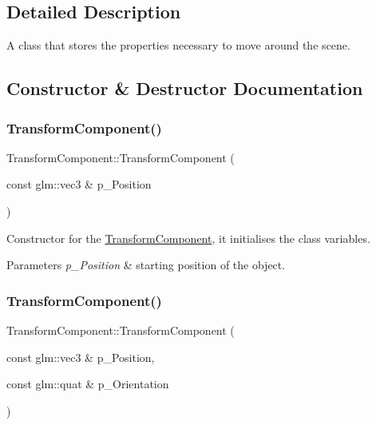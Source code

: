 \subsection{Detailed Description}
A class that stores the properties necessary to move around the scene. 

\subsection{Constructor \& Destructor Documentation}
\mbox{\label{class_transform_component_afc7699834c48ec6c5e222d8b09ec3eb4}} 
\subsubsection{\texorpdfstring{TransformComponent()}{TransformComponent()}\hspace{0.1cm}{\footnotesize\ttfamily [1/3]}}
{\footnotesize\ttfamily Transform\+Component\+::\+Transform\+Component (\begin{DoxyParamCaption}\item[{const glm\+::vec3 \&}]{p\+\_\+\+Position }\end{DoxyParamCaption})\hspace{0.3cm}{\ttfamily [inline]}}



Constructor for the \mbox{\hyperlink{class_transform_component}{Transform\+Component}}, it initialises the class\textquotesingle{} variables. 


\begin{DoxyParams}{Parameters}
{\em p\+\_\+\+Position} & starting position of the object. \\
\hline
\end{DoxyParams}
\mbox{\label{class_transform_component_a86691630518539b29654c71af3e5b50a}} 
\subsubsection{\texorpdfstring{TransformComponent()}{TransformComponent()}\hspace{0.1cm}{\footnotesize\ttfamily [2/3]}}
{\footnotesize\ttfamily Transform\+Component\+::\+Transform\+Component (\begin{DoxyParamCaption}\item[{const glm\+::vec3 \&}]{p\+\_\+\+Position,  }\item[{const glm\+::quat \&}]{p\+\_\+\+Orientation }\end{DoxyParamCaption})\hspace{0.3cm}{\ttfamily [inline]}}




